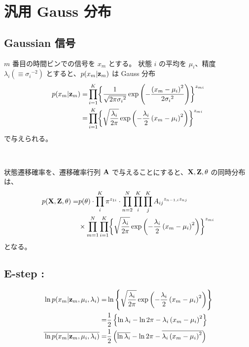 
\section{ 汎用 Gauss 分布 }

\subsection{ Gaussian 信号 }

$m$ 番目の時間ビンでの信号を $x_m$ とする。
状態 $i$ の平均を $\mu_i$、精度 $\lambda_i (\equiv {\sigma_i}^{-2})$ とすると、$p( x_m | {\bf z}_m )$ は Gauss 分布
\begin{align}
  p( x_m | {\bf z}_m )  =&  \prod_{i=1}^K \biggl\{ \frac{1}{\sqrt{ 2 \pi {\sigma_i}^2}} \exp\left( - \frac {\left( x_m - \mu_i \right)^2 }{2 {\sigma_i}^2} \right) \biggr\}^{z_{mi}}  \notag  \\  
    =&  \prod_{i=1}^K \biggl\{ \sqrt{\frac{\lambda_i}{2 \pi}} \exp\left( - \frac {\lambda_i}{2} \left( x_m - \mu_i \right)^2 \right) \biggr\}^{z_{mi}}  \label{eqn:gauss_pXnZn}  
\end{align}
で与えられる。

\

状態遷移確率を、遷移確率行列 ${\bf A}$ で与えることにすると、${\bf X}, {\bf Z}, \theta$ の同時分布は、
\begin{align}
  p( {\bf X}, {\bf Z}, \theta ) =& p( \theta ) \cdot \prod_i^K \pi^{z_{1i}} \cdot \prod_{n=2}^N \prod_i^K \prod_{j}^K {A_{ij}}^{ z_{n-1, i} z_{nj} }  \notag  \\  
    &  \times \prod_{m=1}^N \prod_{i=1}^K \biggl\{ \sqrt{\frac{\lambda_i}{2 \pi}} \exp\left( - \frac {\lambda_i}{2} \left( x_m - \mu_i \right)^2 \right) \biggr\}^{z_{mi}}  \label{eqn:jointDistVbHmmPc}
\end{align}
となる。

\subsection{ E-step :}
\begin{align}
  \ln {p}( x_m | {\bf z}_m, \mu_i, \lambda_i ) =& \ln \left\{  \sqrt{\frac{\lambda_i}{2 \pi}} \exp\left( - \frac {\lambda_i}{2} \left( x_m - \mu_i \right)^2 \right)  \right\}  \\  
%
  =&  \frac{1}{2} \left\{  \ln \lambda_i - \ln 2 \pi - \lambda_i \left( x_m - \mu_i \right)^2  \right\}  \\  
%
  \overline{\mathstrut \ln {p}( x_m | {\bf z}_m, \mu_i, \lambda_i )} =& \frac{1}{2} \left(  \overline{\ln \lambda_i} - \ln 2 \pi - \overline{ \lambda_i \left( x_m - \mu_i \right)^2 }  \right)
\end{align}

